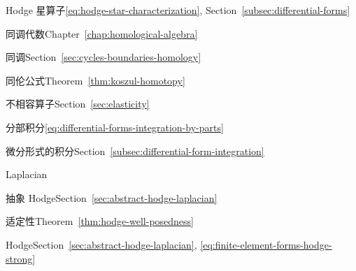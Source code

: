 \begin{theindex}
\item {}\label{index:hodge-star}{Hodge 星算子}\quad \eqref{eq:hodge-star-characterization}, Section~\ref{subsec:differential-forms}

\item {}\label{index:homological-algebra}{同调代数}\quad Chapter~\ref{chap:homological-algebra}

\item {}\label{index:homology}{同调}\quad Section~\ref{sec:cycles-boundaries-homology}

\item {}\label{index:homotopy-formula}{同伦公式}\quad Theorem~\ref{thm:koszul-homotopy}

\item {}\label{index:incompatibility-operator}{不相容算子}\quad Section~\ref{sec:elasticity}

\item {}\label{index:integration-by-parts}{分部积分}\quad \eqref{eq:differential-forms-integration-by-parts}

\item {}\label{index:integration-of-differential-forms}{微分形式的积分}\quad Section~\ref{subsec:differential-form-integration}

\item {}\label{index:laplacian}{Laplacian}

\subitem {}\label{index:laplacian-abstract-hodge}{抽象 Hodge}\quad Section~\ref{sec:abstract-hodge-laplacian}

\subsubitem {}\label{index:laplacian-abstract-hodge-well-posedness-of}{适定性}\quad Theorem~\ref{thm:hodge-well-posedness}

\subitem {}\label{index:laplacian-hodge}{Hodge}\quad Section~\ref{sec:abstract-hodge-laplacian}, \eqref{eq:finite-element-forms-hodge-strong}


\end{theindex}
